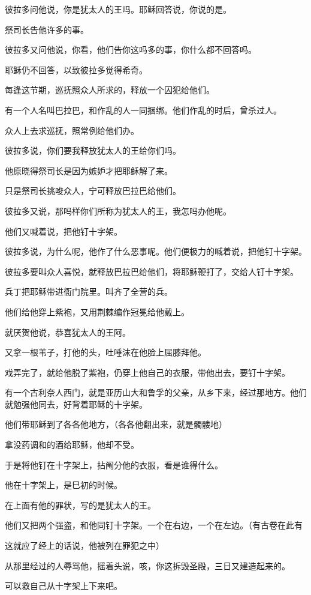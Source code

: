 \documentclass[12pt,oneside]{book}
\begin{document}
彼拉多问他说，你是犹太人的王吗。耶稣回答说，你说的是。

祭司长告他许多的事。

彼拉多又问他说，你看，他们告你这吗多的事，你什么都不回答吗。

耶稣仍不回答，以致彼拉多觉得希奇。

每逢这节期，巡抚照众人所求的，释放一个囚犯给他们。

有一个人名叫巴拉巴，和作乱的人一同捆绑。他们作乱的时后，曾杀过人。

众人上去求巡抚，照常例给他们办。

彼拉多说，你们要我释放犹太人的王给你们吗。

他原晓得祭司长是因为嫉妒才把耶稣解了来。

只是祭司长挑唆众人，宁可释放巴拉巴给他们。

彼拉多又说，那吗样你们所称为犹太人的王，我怎吗办他呢。

他们又喊着说，把他钉十字架。

彼拉多说，为什么呢，他作了什么恶事呢。他们便极力的喊着说，把他钉十字架。

彼拉多要叫众人喜悦，就释放巴拉巴给他们，将耶稣鞭打了，交给人钉十字架。

兵丁把耶稣带进衙门院里。叫齐了全营的兵。

他们给他穿上紫袍，又用荆棘编作冠冕给他戴上。

就厌贺他说，恭喜犹太人的王阿。

又拿一根苇子，打他的头，吐唾沫在他脸上屈膝拜他。

戏弄完了，就给他脱了紫袍，仍穿上他自己的衣服，带他出去，要钉十字架。

有一个古利奈人西门，就是亚历山大和鲁孚的父亲，从乡下来，经过那地方。他们就勉强他同去，好背着耶稣的十字架。

他们带耶稣到了各各他地方，（各各他翻出来，就是髑髅地）

拿没药调和的酒给耶稣，他却不受。

于是将他钉在十字架上，拈阄分他的衣服，看是谁得什么。

他在十字架上，是巳初的时候。

在上面有他的罪状，写的是犹太人的王。

他们又把两个强盗，和他同钉十字架。一个在右边，一个在左边。（有古卷在此有

这就应了经上的话说，他被列在罪犯之中）

从那里经过的人辱骂他，摇着头说，咳，你这拆毁圣殿，三日又建造起来的。

可以救自己从十字架上下来吧。
\end{document}
